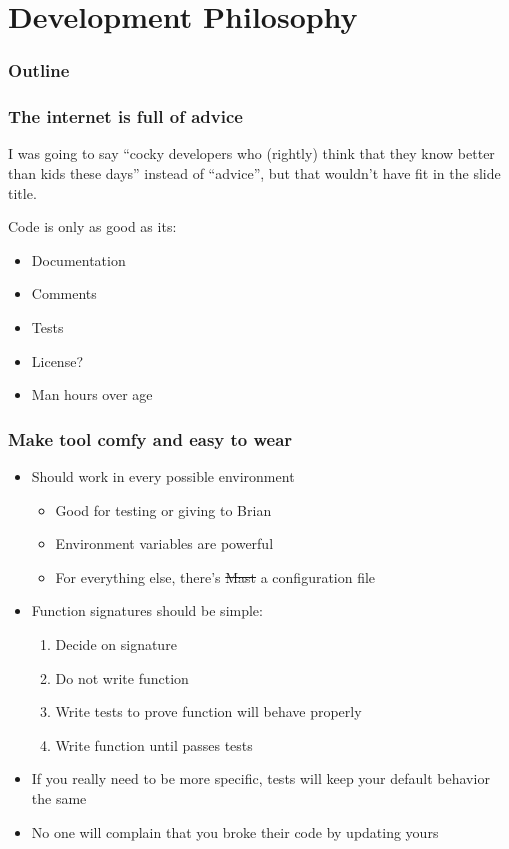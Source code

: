 \documentclass{beamer}
\begin{document}
\section{Development Philosophy}

\begin{frame}
  \frametitle{Outline}
  \tableofcontents[currentsection]
\end{frame}

\begin{frame}
  \frametitle{The internet is full of advice}
  I was going to say
  ``cocky developers who (rightly) think that they know better than kids these days''
  instead of ``advice'', but that wouldn't have fit in the slide title.

  \vfill

  Code is only as good as its:
  \begin{itemize}
  \item Documentation
  \item Comments
  \item Tests
  \item License?
  \item Man hours over age
  \end{itemize}

\end{frame}

\begin{frame}
  \frametitle{Make tool comfy and easy to wear}

  \begin{itemize}
  \item Should work in every possible environment
    \begin{itemize}
    \item Good for testing or giving to Brian
    \item Environment variables are powerful
    \item For everything else, there's \sout{Mast} a configuration file
    \end{itemize}
  \item Function signatures should be simple: \\
    
    \begin{enumerate}
    \item Decide on signature
    \item Do not write function
    \item Write tests to prove function will behave properly
    \item Write function until passes tests
    \end{enumerate}
  \item If you really need to be more specific,
    tests will keep your default behavior the same
  \item No one will complain that you broke their code by updating yours
  \end{itemize}

\end{frame}
\end{document}
